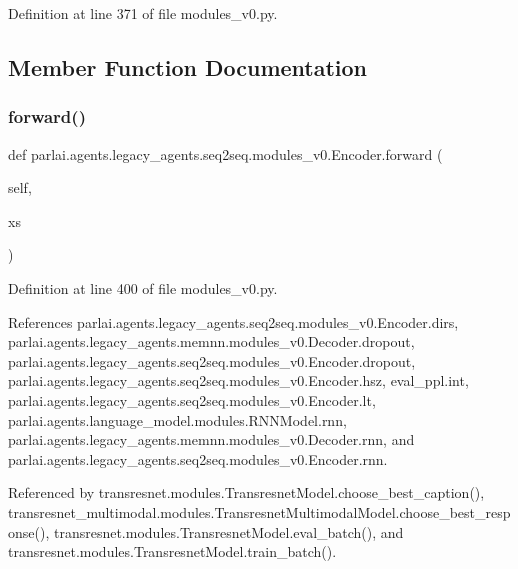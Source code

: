 Definition at line 371 of file modules\+\_\+v0.\+py.



\subsection{Member Function Documentation}
\mbox{\label{classparlai_1_1agents_1_1legacy__agents_1_1seq2seq_1_1modules__v0_1_1Encoder_a53c7f1b88916692c14fa744077b3bd77}} 
\subsubsection{\texorpdfstring{forward()}{forward()}}
{\footnotesize\ttfamily def parlai.\+agents.\+legacy\+\_\+agents.\+seq2seq.\+modules\+\_\+v0.\+Encoder.\+forward (\begin{DoxyParamCaption}\item[{}]{self,  }\item[{}]{xs }\end{DoxyParamCaption})}



Definition at line 400 of file modules\+\_\+v0.\+py.



References parlai.\+agents.\+legacy\+\_\+agents.\+seq2seq.\+modules\+\_\+v0.\+Encoder.\+dirs, parlai.\+agents.\+legacy\+\_\+agents.\+memnn.\+modules\+\_\+v0.\+Decoder.\+dropout, parlai.\+agents.\+legacy\+\_\+agents.\+seq2seq.\+modules\+\_\+v0.\+Encoder.\+dropout, parlai.\+agents.\+legacy\+\_\+agents.\+seq2seq.\+modules\+\_\+v0.\+Encoder.\+hsz, eval\+\_\+ppl.\+int, parlai.\+agents.\+legacy\+\_\+agents.\+seq2seq.\+modules\+\_\+v0.\+Encoder.\+lt, parlai.\+agents.\+language\+\_\+model.\+modules.\+R\+N\+N\+Model.\+rnn, parlai.\+agents.\+legacy\+\_\+agents.\+memnn.\+modules\+\_\+v0.\+Decoder.\+rnn, and parlai.\+agents.\+legacy\+\_\+agents.\+seq2seq.\+modules\+\_\+v0.\+Encoder.\+rnn.



Referenced by transresnet.\+modules.\+Transresnet\+Model.\+choose\+\_\+best\+\_\+caption(), transresnet\+\_\+multimodal.\+modules.\+Transresnet\+Multimodal\+Model.\+choose\+\_\+best\+\_\+response(), transresnet.\+modules.\+Transresnet\+Model.\+eval\+\_\+batch(), and transresnet.\+modules.\+Transresnet\+Model.\+train\+\_\+batch().


